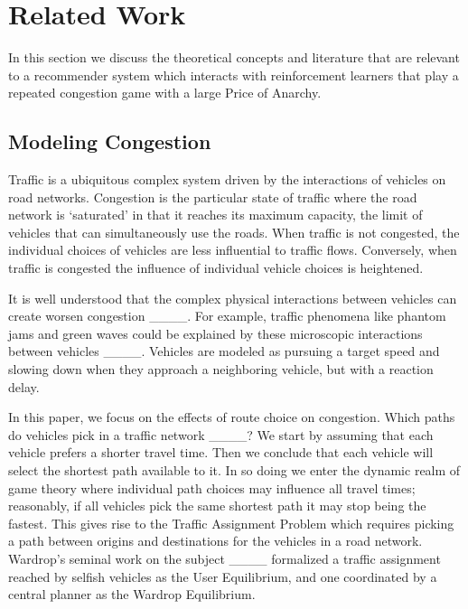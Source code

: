 \section{Related Work}
\label{sec:relatedwork}
In this section we discuss the theoretical concepts and literature that are relevant to a recommender system which interacts with reinforcement learners that play a repeated congestion game with a large Price of Anarchy.

\subsection{Modeling Congestion}

Traffic is a ubiquitous complex system driven by the interactions of vehicles on road networks. Congestion is the particular state of traffic where the road network is `saturated' in that it reaches its maximum capacity, the limit of vehicles that can simultaneously use the roads. When traffic is not congested, the individual choices of vehicles are less influential to traffic flows. Conversely, when traffic is congested the influence of individual vehicle choices is heightened. 

It is well understood that the complex physical interactions between vehicles can create worsen congestion ____. For example, traffic phenomena like phantom jams and green waves could be explained by these microscopic interactions between vehicles ____. Vehicles are modeled as pursuing a target speed and slowing down when they approach a neighboring vehicle, but with a reaction delay. 

In this paper, we focus on the effects of route choice on congestion. Which paths do vehicles pick in a traffic network ____? We start by assuming that each vehicle prefers a shorter travel time. Then we conclude that each vehicle will select the shortest path available to it. In so doing we enter the dynamic realm of game theory where individual path choices may influence all travel times; reasonably, if all vehicles pick the same shortest path it may stop being the fastest. This gives rise to the Traffic Assignment Problem which requires picking a path between origins and destinations for the vehicles in a road network. Wardrop's seminal work on the subject ____ formalized a traffic assignment reached by selfish vehicles as the User Equilibrium, and one coordinated by a central planner as the Wardrop Equilibrium.


